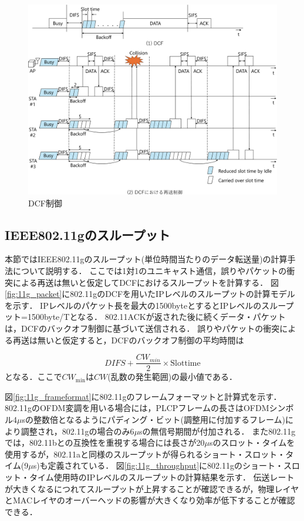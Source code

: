 \documentclass[a4paper,10.5pt]{ltjsarticle}
\begin{document}
\begin{figure}[p]
  \centering
  \includegraphics[width=\linewidth]{DCF.pdf} %
  \caption{DCF制御}
  \label{fig:DCF} %
\end{figure}
\clearpage
\subsection{IEEE802.11gのスループット}
本節ではIEEE802.11gのスループット(単位時間当たりのデータ転送量)の計算手法について説明する．
ここでは1対1のユニキャスト通信，誤りやパケットの衝突による再送は無いと仮定してDCFにおけるスループットを計算する．
図\ref{fig:11g_packet}に802.11gのDCFを用いたIPレベルのスループットの計算モデルを示す．
IPレベルのパケット長を最大の1500byteとするとIPレベルのスループット=1500byte/Tとなる．
802.11ACKが返された後に続くデータ・パケットは，DCFのバックオフ制御に基づいて送信される．
誤りやパケットの衝突による再送は無いと仮定すると，DCFのバックオフ制御の平均時間は

\begin{equation}
   DIFS+\frac{CW_{min}}{2} \times \text{Slottime}
\end{equation}
となる．ここで$CW_{\text{min}}$は$CW$(乱数の発生範囲)の最小値である．\par
図\ref{fig:11g_frameformat}に802.11gのフレームフォーマットと計算式を示す．
802.11gのOFDM変調を用いる場合には，PLCPフレームの長さはOFDMシンボル4$\mu$sの整数倍となるようにパディング・ビット(調整用に付加するフレーム)により調整され，802.11gの場合のみ6$\mu$sの無信号期間が付加される．
また802.11gでは，802.11bとの互換性を重視する場合には長さが20$\mu$sのスロット・タイムを使用するが，802.11aと同様のスループットが得られるショート・スロット・タイム(9$\mu$s)も定義されている．
図\ref{fig:11g_throughput}に802.11gのショート・スロット・タイム使用時のIPレベルのスループットの計算結果を示す．
伝送レートが大きくなるにつれてスループットが上昇することが確認できるが，物理レイヤとMACレイヤのオーバーヘッドの影響が大きくなり効率が低下することが確認できる．
\end{document}
